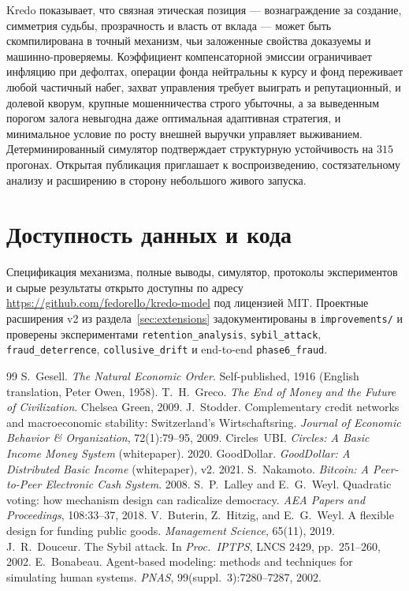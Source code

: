 \documentclass[11pt]{article}
\theoremstyle{plain}
\theoremstyle{definition}
\theoremstyle{remark}
\begin{document}
Kredo показывает, что связная этическая позиция --- вознаграждение за создание, симметрия судьбы, прозрачность и власть от вклада --- может быть скомпилирована в точный механизм, чьи заложенные свойства доказуемы и машинно-проверяемы. Коэффициент компенсаторной эмиссии ограничивает инфляцию при дефолтах, операции фонда нейтральны к курсу и фонд переживает любой частичный набег, захват управления требует выиграть и репутационный, и долевой кворум, крупные мошенничества строго убыточны, а за выведенным порогом залога невыгодна даже оптимальная адаптивная стратегия, и минимальное условие по росту внешней выручки управляет выживанием. Детерминированный симулятор подтверждает структурную устойчивость на $315$ прогонах. Открытая публикация приглашает к воспроизведению, состязательному анализу и расширению в сторону небольшого живого запуска.

\section*{Доступность данных и кода}

Спецификация механизма, полные выводы, симулятор, протоколы экспериментов и сырые результаты открыто доступны по адресу \url{https://github.com/fedorello/kredo-model} под лицензией MIT. Проектные расширения v2 из раздела~\ref{sec:extensions} задокументированы в \texttt{improvements/} и проверены экспериментами \texttt{retention\_analysis}, \texttt{sybil\_attack}, \texttt{fraud\_deterrence}, \texttt{collusive\_drift} и end-to-end \texttt{phase6\_fraud}.

\begin{thebibliography}{99}
 S.~Gesell. \emph{The Natural Economic Order}. Self-published, 1916 (English translation, Peter Owen, 1958).
 T.~H.~Greco. \emph{The End of Money and the Future of Civilization}. Chelsea Green, 2009.
 J.~Stodder. Complementary credit networks and macroeconomic stability: Switzerland's Wirtschaftsring. \emph{Journal of Economic Behavior \& Organization}, 72(1):79--95, 2009.
 Circles~UBI. \emph{Circles: A Basic Income Money System} (whitepaper). 2020.
 GoodDollar. \emph{GoodDollar: A Distributed Basic Income} (whitepaper), v2. 2021.
 S.~Nakamoto. \emph{Bitcoin: A Peer-to-Peer Electronic Cash System}. 2008.
 S.~P.~Lalley and E.~G.~Weyl. Quadratic voting: how mechanism design can radicalize democracy. \emph{AEA Papers and Proceedings}, 108:33--37, 2018.
 V.~Buterin, Z.~Hitzig, and E.~G.~Weyl. A flexible design for funding public goods. \emph{Management Science}, 65(11), 2019.
 J.~R.~Douceur. The Sybil attack. In \emph{Proc.\ IPTPS}, LNCS 2429, pp.~251--260, 2002.
 E.~Bonabeau. Agent-based modeling: methods and techniques for simulating human systems. \emph{PNAS}, 99(suppl.~3):7280--7287, 2002.
\end{thebibliography}
\end{document}
